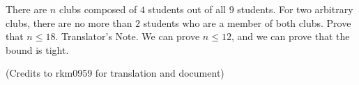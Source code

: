 There are $n$ clubs composed of $4$ students out of all $9$ students. For two arbitrary clubs, there are no more than $2$ students who are a member of both clubs. Prove that $n\le 18$.
Translator’s Note. We can prove $n\le 12$, and we can prove that the bound is tight.

(Credits to rkm0959 for translation and document)